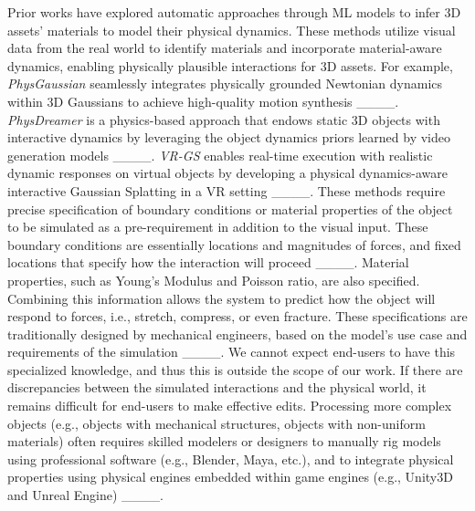 Prior works have explored automatic approaches through ML models to infer 3D assets' materials to model their physical dynamics. 
These methods utilize visual data from the real world to identify materials and incorporate material-aware dynamics, enabling physically plausible interactions for 3D assets.
For example, \textit{PhysGaussian} seamlessly integrates physically grounded Newtonian dynamics within 3D Gaussians to achieve high-quality motion synthesis ____.
\textit{PhysDreamer} is a physics-based approach that endows static 3D objects with interactive dynamics by leveraging the object dynamics priors learned by video generation models ____.
\textit{VR-GS} enables real-time execution with realistic dynamic responses on virtual objects by developing a physical dynamics-aware interactive Gaussian Splatting in a VR setting ____.
These methods require precise specification of boundary conditions or material properties of the object to be simulated as a pre-requirement in addition to the visual input. 
These boundary conditions are essentially locations and magnitudes of forces, and fixed locations that specify how the interaction will proceed ____. 
Material properties, such as Young's Modulus and Poisson ratio, are also specified.
Combining this information allows the system to predict how the object will respond to forces, i.e., stretch, compress, or even fracture. 
These specifications are traditionally designed by mechanical engineers, based on the model's use case and requirements of the simulation ____. 
We cannot expect end-users to have this specialized knowledge, and thus this is outside the scope of our work.
If there are discrepancies between the simulated interactions and the physical world, it remains difficult for end-users to make effective edits.
Processing more complex objects (e.g., objects with mechanical structures, objects with non-uniform materials) often requires skilled modelers or designers to manually rig models using professional software (e.g., Blender, Maya, etc.), and to integrate physical properties using physical engines embedded within game engines (e.g., Unity3D and Unreal Engine) ____.

